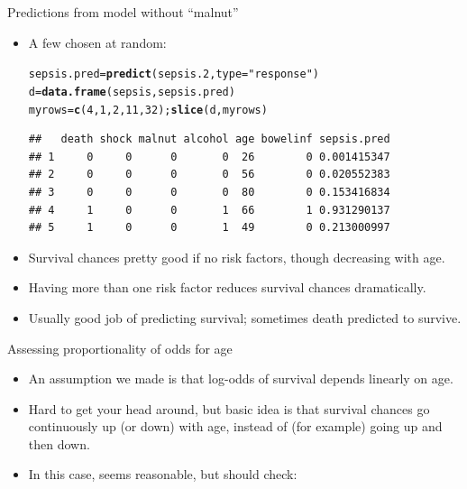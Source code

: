 \documentclass[unknownkeysallowed]{beamer}\usepackage[]{graphicx}\usepackage[]{color}
\makeatletter
\newcommand{\hlnum}[1]{\textcolor[rgb]{0.686,0.059,0.569}{#1}}%
\newcommand{\hlstr}[1]{\textcolor[rgb]{0.192,0.494,0.8}{#1}}%
\newcommand{\hlstd}[1]{\textcolor[rgb]{0.345,0.345,0.345}{#1}}%
\newcommand{\hlkwb}[1]{\textcolor[rgb]{0.69,0.353,0.396}{#1}}%
\newcommand{\hlkwc}[1]{\textcolor[rgb]{0.333,0.667,0.333}{#1}}%
\newcommand{\hlkwd}[1]{\textcolor[rgb]{0.737,0.353,0.396}{\textbf{#1}}}%
\newenvironment{kframe}{%
 \def\at@end@of@kframe{}%
 \ifinner\ifhmode%
  \def\at@end@of@kframe{\end{minipage}}%
  \begin{minipage}{\columnwidth}%
 \fi\fi%
 \def\FrameCommand##1{\hskip\@totalleftmargin \hskip-\fboxsep
 \colorbox{shadecolor}{##1}\hskip-\fboxsep
     \hskip-\linewidth \hskip-\@totalleftmargin \hskip\columnwidth}%
 \MakeFramed {\advance\hsize-\width
   \@totalleftmargin\z@ \linewidth\hsize
   \@setminipage}}%
 {\par\unskip\endMakeFramed%
 \at@end@of@kframe}
\newenvironment{knitrout}{}{} %
\makeatother
\begin{document}
\begin{frame}[fragile]{Predictions from model without ``malnut''}
  
  \begin{itemize}
  \item A few chosen at random:

\begin{knitrout}\footnotesize
{}\color{fgcolor}\begin{kframe}
\begin{alltt}
\hlstd{sepsis.pred}\hlkwb{=}\hlkwd{predict}\hlstd{(sepsis.2,}\hlkwc{type}\hlstd{=}\hlstr{"response"}\hlstd{)}
\hlstd{d}\hlkwb{=}\hlkwd{data.frame}\hlstd{(sepsis,sepsis.pred)}
\hlstd{myrows}\hlkwb{=}\hlkwd{c}\hlstd{(}\hlnum{4}\hlstd{,}\hlnum{1}\hlstd{,}\hlnum{2}\hlstd{,}\hlnum{11}\hlstd{,}\hlnum{32}\hlstd{) ;} \hlkwd{slice}\hlstd{(d,myrows)}
\end{alltt}
\begin{verbatim}
##   death shock malnut alcohol age bowelinf sepsis.pred
## 1     0     0      0       0  26        0 0.001415347
## 2     0     0      0       0  56        0 0.020552383
## 3     0     0      0       0  80        0 0.153416834
## 4     1     0      0       1  66        1 0.931290137
## 5     1     0      0       1  49        0 0.213000997
\end{verbatim}
\end{kframe}
\end{knitrout}

\item Survival chances pretty good if no risk factors, though decreasing with age.
\item Having more than one risk factor reduces survival chances dramatically.
\item Usually good job of predicting survival; sometimes death predicted to survive.
  \end{itemize}
  
\end{frame}

\begin{frame}[fragile]{Assessing proportionality of odds for age}
  \begin{itemize}
  \item An assumption we made is that log-odds of survival depends
    linearly on age.
  \item Hard to get your head around, but 
    basic idea is that survival chances go continuously up (or down)
    with age, instead of (for example) going up and then down.
  \item In this case, seems reasonable, but should check:

  \end{itemize}
    

\end{frame}
 
\end{document}
